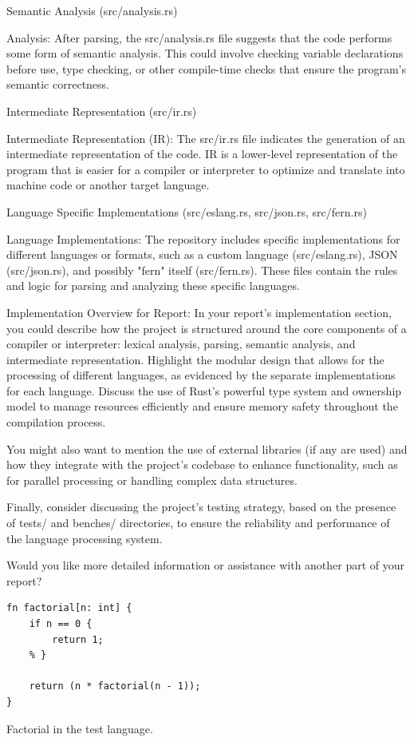 Semantic Analysis (src/analysis.rs)

    Analysis: After parsing, the src/analysis.rs file suggests that the code
performs some form of semantic analysis. This could involve checking variable
declarations before use, type checking, or other compile-time checks that ensure
the program's semantic correctness.

Intermediate Representation (src/ir.rs)

    Intermediate Representation (IR): The src/ir.rs file indicates the
generation of an intermediate representation of the code. IR is a lower-level
representation of the program that is easier for a compiler or interpreter to
optimize and translate into machine code or another target language.

Language Specific Implementations (src/eslang.rs, src/json.rs, src/fern.rs)

    Language Implementations: The repository includes specific implementations
for different languages or formats, such as a custom language (src/eslang.rs),
JSON (src/json.rs), and possibly "fern" itself (src/fern.rs). These files
contain the rules and logic for parsing and analyzing these specific languages.

Implementation Overview for Report:
In your report's implementation section, you could describe how the project
is structured around the core components of a compiler or interpreter: lexical
analysis, parsing, semantic analysis, and intermediate representation. Highlight
the modular design that allows for the processing of different languages, as
evidenced by the separate implementations for each language. Discuss the use of
Rust's powerful type system and ownership model to manage resources efficiently
and ensure memory safety throughout the compilation process.

You might also want to mention the use of external libraries (if any are used)
and how they integrate with the project's codebase to enhance functionality,
such as for parallel processing or handling complex data structures.

Finally, consider discussing the project's testing strategy, based on the
presence of tests/ and benches/ directories, to ensure the reliability and
performance of the language processing system.

Would you like more detailed information or assistance with another part of
your report?

\begin{listing}[H]
\begin{verbatim}
fn factorial[n: int] {
    if n == 0 {
        return 1;
    % } 

    return (n * factorial(n - 1));
}
\end{verbatim}
\caption{Factorial in the test language.}
\label{lst:factorial_example}
\end{listing}

